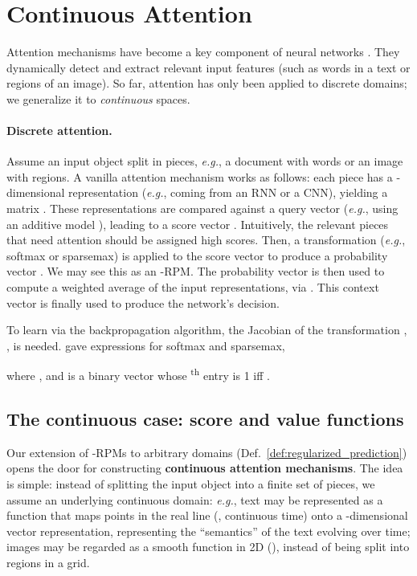 \documentclass{article}
\begin{document}
\section{Continuous Attention}\label{sec:attention}




Attention mechanisms have become a key component of  neural networks \citep{bahdanau2014neural,sukhbaatar2015end,vaswani2017attention}. They dynamically detect and extract relevant input features (such as words in a text or regions of an image). So far, attention has only been applied to discrete domains; we generalize it to {\it continuous} spaces.

\paragraph{Discrete attention.}
Assume an input object split in  pieces, \textit{e.g.}, a document with  words or an image with  regions. 
A vanilla attention mechanism works as follows: each piece has a -dimensional representation (\textit{e.g.}, coming from an RNN or a CNN), yielding a matrix . These representations are compared against a query vector (\textit{e.g.}, using an additive model \citep{bahdanau2014neural}), leading to a score vector . 
Intuitively, the relevant pieces that need attention should be assigned high scores. Then, a transformation  (\textit{e.g.}, softmax or sparsemax) is applied to the score vector to produce a probability vector .
We may see this as an -RPM. The probability vector  is then used to compute a weighted average of the input representations, via . This context vector  is finally used to produce the network's decision.

To learn via the backpropagation algorithm, the Jacobian of the transformation , , is needed. 
\citet{Martins2016ICML} gave  expressions for softmax and sparsemax,

where , and  is a binary vector whose \textsuperscript{th} entry is 1 iff . 

\subsection{The continuous case: score and value functions}
\label{subsec:continuous_attention}

Our extension of -RPMs to arbitrary domains (Def.~\ref{def:regularized_prediction}) opens the door for constructing {\bf continuous attention mechanisms}. The idea is simple: instead of splitting the input object into a finite set of pieces, we assume an underlying continuous domain: \textit{e.g.}, text may be represented as a function  that maps points in the real line (, continuous time) onto a -dimensional vector representation, representing the ``semantics'' of the text evolving over time; images may be regarded as a smooth function in 2D (), instead of being split into regions in a grid. 
\end{document}
